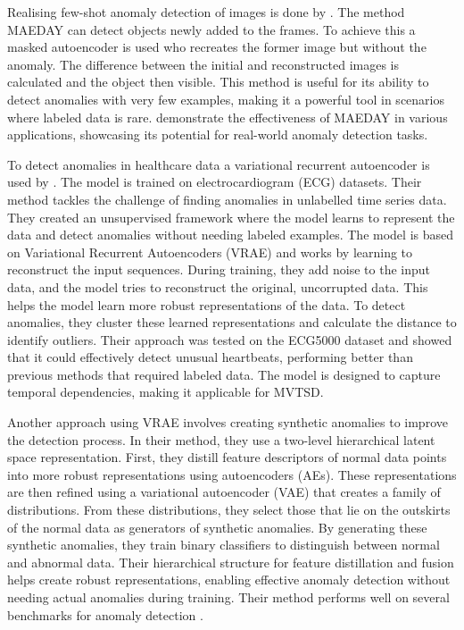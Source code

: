 Realising few-shot anomaly detection of images is done by . The method MAEDAY can detect objects newly added to the frames. To achieve this a masked autoencoder is used who recreates the former image but without the anomaly. The difference between the initial and reconstructed images is calculated and the object then visible.
This method is useful for its ability to detect anomalies with very few examples, making it a powerful tool in scenarios where labeled data is rare.  demonstrate the effectiveness of MAEDAY in various applications, showcasing its potential for real-world anomaly detection tasks.

To detect anomalies in healthcare data a variational recurrent autoencoder is used by .
The model is trained on electrocardiogram (ECG) datasets. Their method tackles the challenge of finding anomalies in unlabelled time series data. They created an unsupervised framework where the model learns to represent the data and detect anomalies without needing labeled examples.
The model is based on Variational Recurrent Autoencoders (VRAE) and works by learning to reconstruct the input sequences. During training, they add noise to the input data, and the model tries to reconstruct the original, uncorrupted data. This helps the model learn more robust representations of the data. To detect anomalies, they cluster these learned representations and calculate the distance to identify outliers. Their approach was tested on the ECG5000 dataset and showed that it could effectively detect unusual heartbeats, performing better than previous methods that required labeled data. The model is designed to capture temporal dependencies, making it applicable for MVTSD.

%
Another approach using VRAE involves creating synthetic anomalies to improve the detection process. In their method, they use a two-level hierarchical latent space representation. First, they distill feature descriptors of normal data points into more robust representations using autoencoders (AEs). These representations are then refined using a variational autoencoder (VAE) that creates a family of distributions. From these distributions, they select those that lie on the outskirts of the normal data as generators of synthetic anomalies.
By generating these synthetic anomalies, they train binary classifiers to distinguish between normal and abnormal data. Their hierarchical structure for feature distillation and fusion helps create robust representations, enabling effective anomaly detection without needing actual anomalies during training. Their method performs well on several benchmarks for anomaly detection  .

